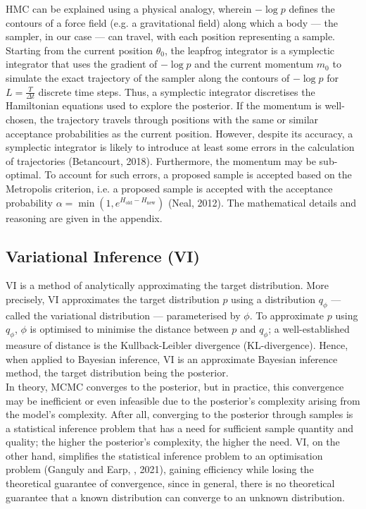 \documentclass[conference]{IEEEtran}
\begin{document}
HMC can be explained using a physical analogy, wherein $-\log p$ defines the contours of a force field (e.g. a gravitational field) along which a body — the sampler, in our case — can travel, with each position representing a sample. Starting from the current position $\theta_0$, the leapfrog integrator is a symplectic integrator that uses the gradient of $-\log p$ and the current momentum $m_0$ to simulate the exact trajectory of the sampler along the contours of $-\log p$ for $L = \frac{T}{\Delta t}$ discrete time steps. Thus, a symplectic integrator discretises the Hamiltonian equations used to explore the posterior. If the momentum is well-chosen, the trajectory travels through positions with the same or similar acceptance probabilities as the current position. However, despite its accuracy, a symplectic integrator is likely to introduce at least some errors in the calculation of trajectories (Betancourt, 2018). Furthermore, the momentum may be sub-optimal. To account for such errors, a proposed sample is accepted based on the Metropolis criterion, i.e. a proposed sample is accepted with the acceptance probability $\alpha = \min(1, e^{H_\text{old} - H_\text{new}})$ (Neal, 2012). The mathematical details and reasoning are given in the appendix.

\subsection{Variational Inference (VI)}
VI is a method of analytically approximating the target distribution. More precisely, VI approximates the target distribution $p$ using a distribution $q_\phi$ — called the variational distribution — parameterised by $\phi$. To approximate $p$ using $q_{\phi}$, $\phi$ is optimised to minimise the distance between $p$ and $q_{\phi}$; a well-established measure of distance is the Kullback-Leibler divergence (KL-divergence). Hence, when applied to Bayesian inference, VI is an approximate Bayesian inference method, the target distribution being the posterior.\\

In theory, MCMC converges to the posterior, but in practice, this convergence may be inefficient or even infeasible due to the posterior's complexity arising from the model's complexity. After all, converging to the posterior through samples is a statistical inference problem that has a need for sufficient sample quantity and quality; the higher the posterior's complexity, the higher the need. VI, on the other hand, simplifies the statistical inference problem to an optimisation problem (Ganguly and Earp, , 2021), gaining efficiency while losing the theoretical guarantee of convergence, since in general, there is no theoretical guarantee that a known distribution can converge to an unknown distribution. \\
\end{document}
